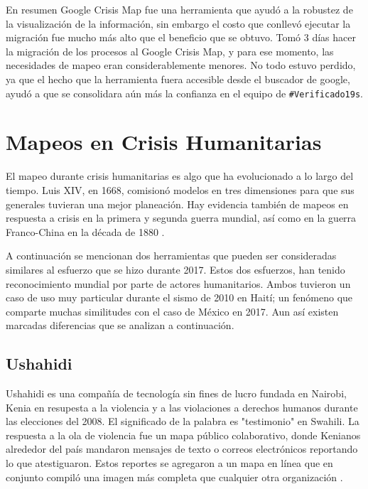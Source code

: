 \documentclass[12pt,spanish,oneside,breaklinks]{book}
\begin{document}
En resumen Google Crisis Map fue una herramienta que ayudó a la robustez de la visualización de la información, sin embargo el costo que conllevó ejecutar la migración fue mucho más alto que el beneficio que se obtuvo. Tomó 3 días hacer la migración de los procesos al Google Crisis Map, y para ese momento, las necesidades de mapeo eran considerablemente menores. No todo estuvo perdido, ya que el hecho que la herramienta fuera accesible desde el buscador de google, ayudó a que se consolidara aún más la confianza en el equipo de \texttt{\#Verificado19s}.

\newpage


\chapter{Mapeos en Crisis Humanitarias}
\label{sec:orga363301}

El mapeo durante crisis humanitarias es algo que ha evolucionado a lo largo del tiempo. Luis XIV, en 1668, comisionó modelos en tres dimensiones para que sus generales tuvieran una mejor planeación. Hay evidencia también de mapeos en respuesta a crisis en la primera y segunda guerra mundial, así como en la guerra Franco-China en la década de 1880 \cite{meier2012}.

A continuación se mencionan dos herramientas que pueden ser consideradas similares al esfuerzo que se hizo durante 2017. Estos dos esfuerzos, han tenido reconocimiento mundial por parte de actores humanitarios. Ambos tuvieron un caso de uso muy particular durante el sismo de 2010 en Haití; un fenómeno que comparte muchas similitudes con el caso de México en 2017. Aun así existen marcadas diferencias que se analizan a continuación.

\section{Ushahidi}
\label{sec:org1fede6a}

Ushahidi es una compañía de tecnología sin fines de lucro fundada en Nairobi, Kenia en resupesta a la violencia y a las violaciones a derechos humanos durante las elecciones del 2008. El significado de la palabra es "testimonio" en Swahili\cite{ushahidi}.  La respuesta a la ola de violencia fue un mapa público colaborativo, donde Kenianos alrededor del país mandaron mensajes de texto o correos electrónicos reportando lo que atestiguaron. Estos reportes se agregaron a un mapa en línea que en conjunto compiló una imagen más completa que cualquier otra organización \cite{guardianusha}.
\end{document}
